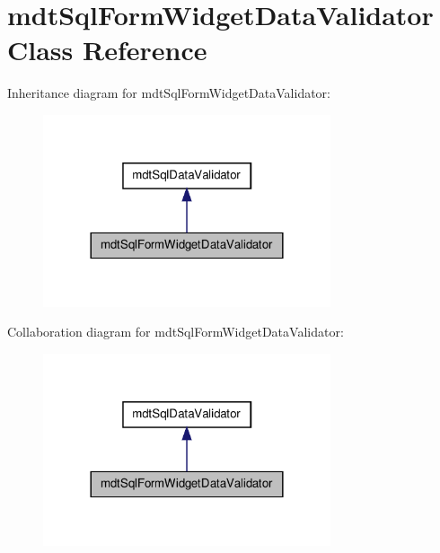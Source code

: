 \hypertarget{classmdt_sql_form_widget_data_validator}{
\section{mdtSqlFormWidgetDataValidator Class Reference}
\label{classmdt_sql_form_widget_data_validator}
}


Inheritance diagram for mdtSqlFormWidgetDataValidator:
\nopagebreak
\begin{figure}[H]
\begin{center}
\leavevmode
\includegraphics[width=240pt]{classmdt_sql_form_widget_data_validator__inherit__graph}
\end{center}
\end{figure}


Collaboration diagram for mdtSqlFormWidgetDataValidator:
\nopagebreak
\begin{figure}[H]
\begin{center}
\leavevmode
\includegraphics[width=240pt]{classmdt_sql_form_widget_data_validator__coll__graph}
\end{center}
\end{figure}
